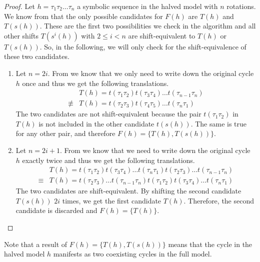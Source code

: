 \begin{proof}
    Let $h = \tau_1\tau_2 \dots \tau_n$ a symbolic sequence in the halved model with $n$ rotations.
    We know from  that the only possible candidates for $F(h)$ are $T(h)$ and $T(s(h))$.
    These are the first two possibilities we check in the algorithm and all other shifts $T(s^i(h))$ with $2 \leq i < n$ are shift-equivalent to $T(h)$ or $T(s(h))$.
    So, in the following, we will only check for the shift-equivalence of these two candidates.
    \begin{enumerate}
        \item Let $n = 2i$.
              From  we know that we only need to write down the original cycle $h$ once and thus we get the following translations.
              \begin{align*}
                          & T(h) = t(\tau_1\tau_2) t(\tau_3\tau_4) \dots t(\tau_{n-1}\tau_n) \\
                  \nequiv & T(h) = t(\tau_2\tau_3) t(\tau_4\tau_5) \dots t(\tau_n\tau_1)
              \end{align*}
              The two candidates are not shift-equivalent because the pair $t(\tau_1\tau_2)$ in $T(h)$ is not included in the other candidate $t(s(h))$.
              The same is true for any other pair, and therefore $F(h) = \{T(h), T(s(h))\}$.
        \item Let $n = 2i + 1$.
              From  we know that we need to write down the original cycle $h$ exactly twice and thus we get the following translations.
              \begin{align*}
                         & T(h) = t(\tau_1\tau_2) t(\tau_3\tau_4) \dots t(\tau_n\tau_1) t(\tau_2\tau_3) \dots t(\tau_{n-1}\tau_n) \\
                  \equiv & T(h) = t(\tau_2\tau_3) \dots t(\tau_{n-1}\tau_n) t(\tau_1\tau_2) t(\tau_3\tau_4) \dots t(\tau_n\tau_1)
              \end{align*}
              The two candidates are shift-equivalent.
              By shifting the second candidate $T(s(h))$ $2i$ times, we get the first candidate $T(h)$.
              Therefore, the second candidate is discarded and $F(h) = \{T(h)\}$.
    \end{enumerate}
\end{proof}

Note that a result of $F(h) = \{T(h), T(s(h))\}$ means that the cycle in the halved model $h$ manifests as two coexisting cycles in the full model.

